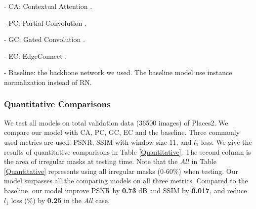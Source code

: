 \documentclass[letterpaper]{article} %
\begin{document}
- CA: Contextual Attention \cite{yu2018generative}.

- PC: Partial Convolution \cite{liu2018image}.

- GC: Gated Convolution \cite{yu2019free}.

- EC: EdgeConnect \cite{nazeri2019edgeconnect}.

- Baseline: the backbone network we used. The baseline model use instance normalization instead of RN.
\subsubsection{Quantitative Comparisons}
We test all models on total validation data (36500 images) of Places2. We compare our model with CA, PC, GC, EC and the baseline. Three commonly used metrics are used: PSNR, SSIM \cite{wang2004image} with window size 11, and $l_1$ loss. We give the results of quantitative comparisons in Table \ref{Quantitative}. The second column is the area of irregular masks at testing time. Note that the $All$ in Table \ref{Quantitative} represents using all irregular masks (0-60\%) when testing. Our model surpasses all the comparing models on all three metrics. Compared to the baseline, our model improve PSNR by \textbf{0.73} dB and SSIM by \textbf{0.017}, and reduce $l_1$ loss (\%) by \textbf{0.25} in the $All$ case.
\end{document}
